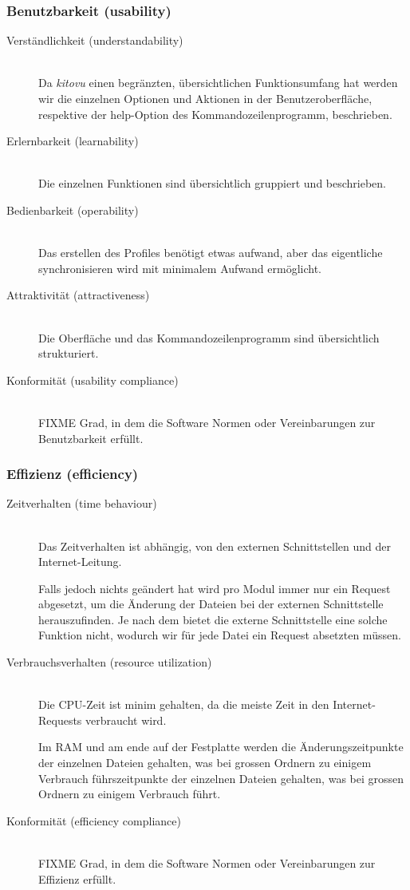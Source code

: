 \documentclass[a4paper]{article}
\begin{document}
\subsubsection{Benutzbarkeit (usability)}

\begin{description}
  \item[Verständlichkeit (understandability)] \strut \\
    Da \emph{kitovu} einen begränzten, übersichtlichen Funktionsumfang hat werden wir die einzelnen Optionen und Aktionen in der Benutzeroberfläche, respektive der help-Option des Kommandozeilenprogramm, beschrieben.
  \item[Erlernbarkeit (learnability)] \strut \\
    Die einzelnen Funktionen sind übersichtlich gruppiert und beschrieben.
  \item[Bedienbarkeit (operability)] \strut \\
    Das erstellen des Profiles benötigt etwas aufwand, aber das eigentliche synchronisieren wird mit minimalem Aufwand ermöglicht.
  \item[Attraktivität (attractiveness)] \strut \\
    Die Oberfläche und das Kommandozeilenprogramm sind übersichtlich strukturiert.
  \item[Konformität (usability compliance)] \strut \\
    FIXME Grad, in dem die Software Normen oder Vereinbarungen zur Benutzbarkeit erfüllt.
\end{description}

\subsubsection{Effizienz (efficiency)}

\begin{description}
  \item[Zeitverhalten (time behaviour)] \strut \\
    Das Zeitverhalten ist abhängig, von den externen Schnittstellen und der Internet-Leitung.

    Falls jedoch nichts geändert hat wird pro Modul immer nur ein Request abgesetzt, um die Änderung der Dateien bei der externen Schnittstelle herauszufinden.
    Je nach dem bietet die externe Schnittstelle eine solche Funktion nicht, wodurch wir für jede Datei ein Request absetzten müssen.
  \item[Verbrauchsverhalten (resource utilization)] \strut \\
    Die CPU-Zeit ist minim gehalten, da die meiste Zeit in den Internet-Requests verbraucht wird.

    Im RAM und am ende auf der Festplatte werden die Änderungszeitpunkte der einzelnen Dateien gehalten, was bei grossen Ordnern zu einigem Verbrauch führszeitpunkte der einzelnen Dateien gehalten, was bei grossen Ordnern zu einigem Verbrauch führt.
  \item[Konformität (efficiency compliance)] \strut \\
    FIXME Grad, in dem die Software Normen oder Vereinbarungen zur Effizienz erfüllt.
\end{description}
\end{document}
